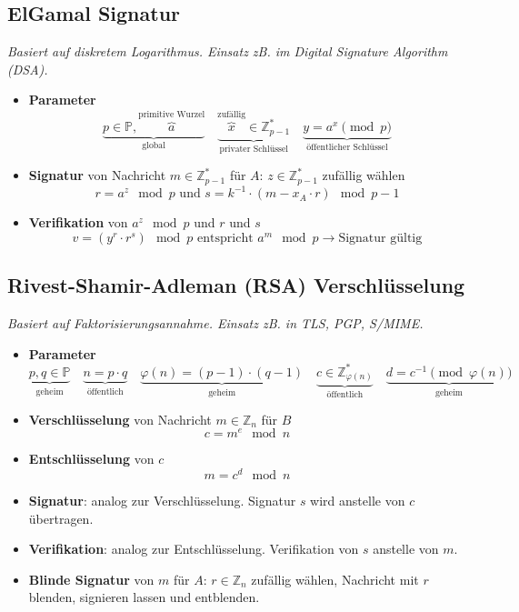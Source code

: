 \documentclass{article}
\begin{document}
\subsection{ElGamal Signatur}
\textit{Basiert auf diskretem Logarithmus. Einsatz zB. im Digital Signature Algorithm (DSA).}
\begin{itemize}
  \item \textbf{Parameter}
    \[
      \underbrace{p\in\mathbb{P}, \overbrace{a}^\text{primitive Wurzel}}_\text{global}\quad
      \underbrace{\overbrace{x}^\text{zufällig} \in \mathbb{Z}^*_{p-1}}_\text{privater Schlüssel}\quad
      \underbrace{y = a^{x} \pmod{p}}_\text{öffentlicher Schlüssel}
    \]
  \item \textbf{Signatur} von Nachricht $m\in\mathbb{Z}^*_{p-1}$ für $A$: $z\in\mathbb{Z}^*_{p-1}$ zufällig wählen
    \[ r = a^z \mod{p} \text{ und } s = k^{-1} \cdot (m - x_A \cdot r) \mod{p-1} \]
  \item \textbf{Verifikation} von $a^z \mod{p}$ und $r$ und $s$
    \[ v = (y^r \cdot r^s) \mod{p} \text{ entspricht } a^m \mod{p} \to \text{Signatur gültig} \]
\end{itemize}

\subsection{Rivest-Shamir-Adleman (RSA) Verschlüsselung}
\textit{Basiert auf Faktorisierungsannahme. Einsatz zB. in TLS, PGP, S/MIME.}
\begin{itemize}
  \item \textbf{Parameter}
    \[
      \underbrace{p,q\in\mathbb{P}}_\text{geheim}\quad
      \underbrace{n=p\cdot q}_\text{öffentlich}\quad
      \underbrace{\varphi(n)=(p-1)\cdot(q-1)}_\text{geheim}\quad
      \underbrace{c\in\mathbb{Z}^*_{\varphi(n)}}_\text{öffentlich}\quad
      \underbrace{d=c^{-1} \pmod{\varphi(n)}}_\text{geheim}
    \]
  \item \textbf{Verschlüsselung} von Nachricht $m\in\mathbb{Z}_n$ für $B$
    \[ c = m^e \mod{n} \]
  \item \textbf{Entschlüsselung} von $c$
    \[ m = c^d \mod{n} \]
  \item \textbf{Signatur}: analog zur Verschlüsselung. Signatur $s$ wird anstelle von $c$ übertragen.
  \item \textbf{Verifikation}: analog zur Entschlüsselung. Verifikation von $s$ anstelle von $m$.
  \item \textbf{Blinde Signatur} von $m$ für $A$: $r\in\mathbb{Z}_n$ zufällig wählen, Nachricht mit $r$ blenden, signieren lassen und entblenden.
\end{itemize}
\end{document}
